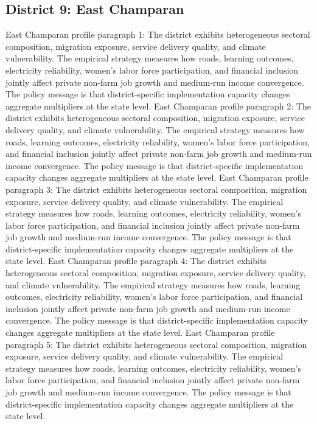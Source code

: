 \documentclass[preprint,12pt]{elsarticle}
\begin{document}
\subsection{District 9: East Champaran}
East Champaran profile paragraph 1: The district exhibits heterogeneous sectoral composition, migration exposure, service delivery quality, and climate vulnerability. The empirical strategy measures how roads, learning outcomes, electricity reliability, women's labor force participation, and financial inclusion jointly affect private non-farm job growth and medium-run income convergence. The policy message is that district-specific implementation capacity changes aggregate multipliers at the state level.
East Champaran profile paragraph 2: The district exhibits heterogeneous sectoral composition, migration exposure, service delivery quality, and climate vulnerability. The empirical strategy measures how roads, learning outcomes, electricity reliability, women's labor force participation, and financial inclusion jointly affect private non-farm job growth and medium-run income convergence. The policy message is that district-specific implementation capacity changes aggregate multipliers at the state level.
East Champaran profile paragraph 3: The district exhibits heterogeneous sectoral composition, migration exposure, service delivery quality, and climate vulnerability. The empirical strategy measures how roads, learning outcomes, electricity reliability, women's labor force participation, and financial inclusion jointly affect private non-farm job growth and medium-run income convergence. The policy message is that district-specific implementation capacity changes aggregate multipliers at the state level.
East Champaran profile paragraph 4: The district exhibits heterogeneous sectoral composition, migration exposure, service delivery quality, and climate vulnerability. The empirical strategy measures how roads, learning outcomes, electricity reliability, women's labor force participation, and financial inclusion jointly affect private non-farm job growth and medium-run income convergence. The policy message is that district-specific implementation capacity changes aggregate multipliers at the state level.
East Champaran profile paragraph 5: The district exhibits heterogeneous sectoral composition, migration exposure, service delivery quality, and climate vulnerability. The empirical strategy measures how roads, learning outcomes, electricity reliability, women's labor force participation, and financial inclusion jointly affect private non-farm job growth and medium-run income convergence. The policy message is that district-specific implementation capacity changes aggregate multipliers at the state level.
\end{document}
